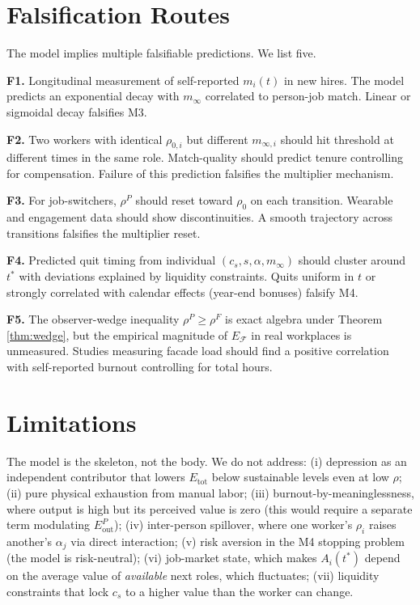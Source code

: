 \documentclass[11pt]{article}
\begin{document}
\section{Falsification Routes}

The model implies multiple falsifiable predictions. We list five.

\noindent\textbf{F1.} Longitudinal measurement of self-reported $m_i(t)$ in
new hires. The model predicts an exponential decay with $m_\infty$ correlated
to person-job match. Linear or sigmoidal decay falsifies M3.

\noindent\textbf{F2.} Two workers with identical $\rho_{0,i}$ but different
$m_{\infty,i}$ should hit threshold at different times in the same role.
Match-quality should predict tenure controlling for compensation. Failure of
this prediction falsifies the multiplier mechanism.

\noindent\textbf{F3.} For job-switchers, $\rho^P$ should reset toward $\rho_0$
on each transition. Wearable and engagement data should show discontinuities.
A smooth trajectory across transitions falsifies the multiplier reset.

\noindent\textbf{F4.} Predicted quit timing from individual $(c_s, s, \alpha,
m_\infty)$ should cluster around $t^*$ with deviations explained by liquidity
constraints. Quits uniform in $t$ or strongly correlated with calendar effects
(year-end bonuses) falsify M4.

\noindent\textbf{F5.} The observer-wedge inequality $\rho^P \geq \rho^F$ is
exact algebra under Theorem \ref{thm:wedge}, but the empirical magnitude of
$E_{\mathcal{F}}$ in real workplaces is unmeasured. Studies measuring facade
load should find a positive correlation with self-reported burnout
controlling for total hours.

\section{Limitations}

The model is the skeleton, not the body. We do not address: (i) depression
as an independent contributor that lowers $E_{\text{tot}}$ below sustainable
levels even at low $\rho$; (ii) pure physical exhaustion from manual labor;
(iii) burnout-by-meaninglessness, where output is high but its perceived
value is zero (this would require a separate term modulating $E_{\text{out}}^P$);
(iv) inter-person spillover, where one worker's $\rho_i$ raises another's
$\alpha_j$ via direct interaction; (v) risk aversion in the M4 stopping
problem (the model is risk-neutral); (vi) job-market state, which makes
$A_i(t^*)$ depend on the average value of \textit{available} next roles,
which fluctuates; (vii) liquidity constraints that lock $c_s$ to a higher
value than the worker can change.
\end{document}
